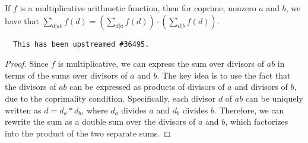 \begin{theorem}
\label{sum_divisors_mul_of_coprime}
\leanok
If $f$ is a multiplicative arithmetic function, then for coprime, nonzero $a$ and $b$, we have that
  $\sum_{d | ab} f(d) = (\sum_{d | a} f(d)) \cdot (\sum_{d | b} f(d))$.
  \begin{verbatim}
  This has been upstreamed #36495.
  \end{verbatim}
\end{theorem}
\begin{proof}
Since $f$ is multiplicative, we can express the sum over divisors of $ab$ in terms of the sums over divisors of $a$ and $b$. The key idea is to use the fact that the divisors of $ab$ can be expressed as products of divisors of $a$ and divisors of $b$, due to the coprimality condition. Specifically, each divisor $d$ of $ab$ can be uniquely written as $d = d_a * d_b$, where $d_a$ divides $a$ and $d_b$ divides $b$. Therefore, we can rewrite the sum as a double sum over the divisors of $a$ and $b$, which factorizes into the product of the two separate sums.
\end{proof}
